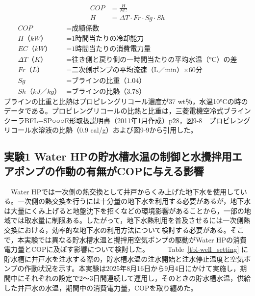 \documentclass[
  japanese,
  11pt,
  letterpaper,
  DIV=11,
  numbers=noendperiod]{scrartcl}
\begin{document}
\[
\begin{aligned}
COP &= \frac{H}{EC}\\
H &= \Delta T \cdot Fr \cdot Sg \cdot Sh
\end{aligned}
\] \[
\begin{aligned}
COP &= \text{成績係数}\\
H（kW） &= \text{1時間当たりの冷却能力}\\
EC（kW） &= \text{1時間当たりの消費電力量}\\
ΔT（K） &= \text{往き側と戻り側の一時間当たりの平均水温（°C）の差}\\
Fr（L） &= \text{二次側ポンプの平均流速（L／min）×60分}\\
Sg &= \text{ブラインの比重（1.04）}\\
Sh（kJ／kg） &= \text{ブラインの比熱（3.78）}
\end{aligned}
\] ブラインの比重と比熱はプロピレングリコール濃度が37
wt％，水温10°Cの時のデータである。プロピレングリコールの比熱と比重は，三菱電機空冷式ブラインクーラBFL−SP○○○E形取扱説明書（2011年1月作成）p28，図9-8　プロピレングリコール水溶液の比熱（0.9
cal/g）および図9-9から引用した。

\subsection{実験1 Water
HPの貯水槽水温の制御と水攪拌用エアポンプの作動の有無がCOPに与える影響}\label{ux5b9fux9a131-water-hpux306eux8cafux6c34ux69fdux6c34ux6e29ux306eux5236ux5fa1ux3068ux6c34ux652aux62ccux7528ux30a8ux30a2ux30ddux30f3ux30d7ux306eux4f5cux52d5ux306eux6709ux7121ux304ccopux306bux4e0eux3048ux308bux5f71ux97ff}

　Water
HPでは一次側の熱交換として井戸からくみ上げた地下水を使用している。一次側の熱交換を行うには十分量の地下水を利用する必要があるが，地下水は大量にくみ上げると地盤沈下を招くなどの環境影響があることから，一部の地域では取水量に制限ある。したがって，地下水熱利用を普及させるには一次側熱交換における，効率的な地下水の利用方法について検討する必要がある。そこで，本実験では異なる貯水槽水温と攪拌用空気ポンプの駆動がWater
HPの消費電力量とCOPに及ぼす影響について検討した。 　
　Table~\ref{tbl-well_setting}
に貯水槽に井戸水を注水する際の，貯水槽水温の注水開始と注水停止温度と空気ポンプの作動状況を示す。本実験は2025年8月16日から9月4日にかけて実施し，期間中にそれぞれの設定で2〜3日間連続して運用し，そのときの貯水槽水温，供給した井戸水の水温，期間中の消費電力量，COPを取り纏めた。
\end{document}
